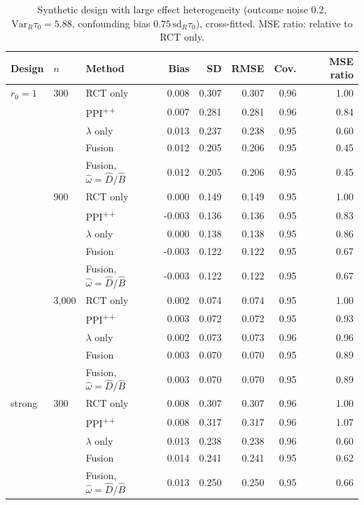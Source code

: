 \begin{table}[h]
\caption{Synthetic design with large effect heterogeneity (outcome noise 0.2, $\mathrm{Var}_R\tau_0=5.88$, confounding bias $0.75\,\mathrm{sd}_R\tau_0$), cross-fitted. MSE ratio: relative to RCT only.}
\begin{center}\footnotesize
\begin{tabular}{@{}lllrrrrr@{}}
\toprule
Design & $n$ & Method & Bias & SD & RMSE & Cov. & MSE ratio \\
\midrule
$r_0{=}1$ & 300 & RCT only & 0.008 & 0.307 & 0.307 & 0.96 & 1.00 \\
 &  & PPI\textsuperscript{++} & 0.007 & 0.281 & 0.281 & 0.96 & 0.84 \\
 &  & $\lambda$ only & 0.013 & 0.237 & 0.238 & 0.95 & 0.60 \\
 &  & Fusion & 0.012 & 0.205 & 0.206 & 0.95 & 0.45 \\
 &  & Fusion, $\hat\omega=\hat D/\hat B$ & 0.012 & 0.205 & 0.206 & 0.95 & 0.45 \\
\addlinespace
 & 900 & RCT only & 0.000 & 0.149 & 0.149 & 0.95 & 1.00 \\
 &  & PPI\textsuperscript{++} & -0.003 & 0.136 & 0.136 & 0.95 & 0.83 \\
 &  & $\lambda$ only & 0.000 & 0.138 & 0.138 & 0.95 & 0.86 \\
 &  & Fusion & -0.003 & 0.122 & 0.122 & 0.95 & 0.67 \\
 &  & Fusion, $\hat\omega=\hat D/\hat B$ & -0.003 & 0.122 & 0.122 & 0.95 & 0.67 \\
\addlinespace
 & 3{,}000 & RCT only & 0.002 & 0.074 & 0.074 & 0.95 & 1.00 \\
 &  & PPI\textsuperscript{++} & 0.003 & 0.072 & 0.072 & 0.95 & 0.93 \\
 &  & $\lambda$ only & 0.002 & 0.073 & 0.073 & 0.96 & 0.96 \\
 &  & Fusion & 0.003 & 0.070 & 0.070 & 0.95 & 0.89 \\
 &  & Fusion, $\hat\omega=\hat D/\hat B$ & 0.003 & 0.070 & 0.070 & 0.95 & 0.89 \\
\midrule
strong & 300 & RCT only & 0.008 & 0.307 & 0.307 & 0.96 & 1.00 \\
 &  & PPI\textsuperscript{++} & 0.008 & 0.317 & 0.317 & 0.96 & 1.07 \\
 &  & $\lambda$ only & 0.013 & 0.238 & 0.238 & 0.96 & 0.60 \\
 &  & Fusion & 0.014 & 0.241 & 0.241 & 0.95 & 0.62 \\
 &  & Fusion, $\hat\omega=\hat D/\hat B$ & 0.013 & 0.250 & 0.250 & 0.95 & 0.66 \\

\end{tabular}
\end{center}
\end{table}
